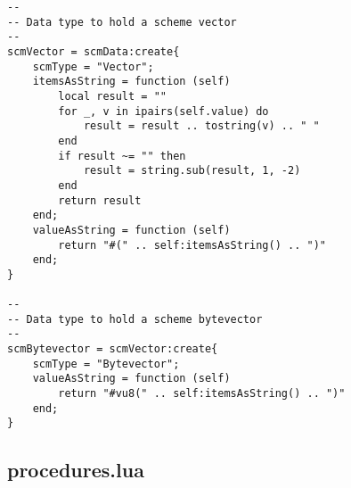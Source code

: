 \begin{verbatim}
--
-- Data type to hold a scheme vector
--
scmVector = scmData:create{
    scmType = "Vector";
    itemsAsString = function (self)
        local result = ""
        for _, v in ipairs(self.value) do
            result = result .. tostring(v) .. " "
        end
        if result ~= "" then
            result = string.sub(result, 1, -2)
        end
        return result
    end;
    valueAsString = function (self)
        return "#(" .. self:itemsAsString() .. ")"
    end;
}

--
-- Data type to hold a scheme bytevector
--
scmBytevector = scmVector:create{
    scmType = "Bytevector";
    valueAsString = function (self)
        return "#vu8(" .. self:itemsAsString() .. ")"
    end;
}
\end{verbatim}

\subsection{procedures.lua}
